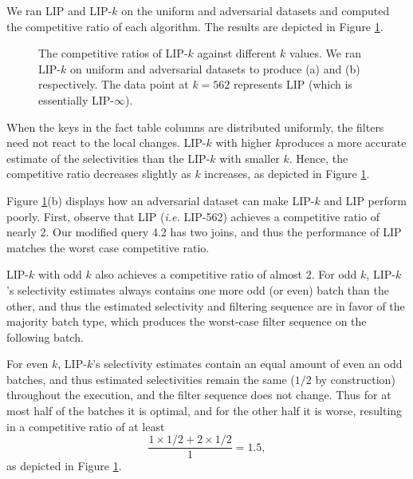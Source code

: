 We ran LIP and LIP-$k$ on the uniform and adversarial datasets and computed the competitive ratio of each algorithm.
The results are depicted in Figure \ref{fig:cr}. 

\begin{figure}
    \centering

    \quad
    
    \caption{The competitive ratios of LIP-$k$ against different $k$ values. We ran LIP-$k$ on uniform and adversarial datasets to produce (a) and (b) respectively. The data point at $k = 562$ represents LIP (which is essentially LIP-$\infty$).}
    \label{fig:cr}
\end{figure}

When the keys in the fact table columns are distributed uniformly, the filters need not react to the local changes. LIP-$k$ with higher $k$produces a more accurate estimate of the selectivities than the LIP-$k$ with smaller $k$. Hence, the competitive ratio decreases slightly as $k$ increases, as depicted in Figure \ref{fig:cr}.

Figure \ref{fig:cr}(b) displays how an adversarial dataset can make LIP-$k$ and LIP perform poorly. 
First, observe that LIP ({\it i.e.} LIP-562) achieves a competitive ratio of nearly 2.
Our modified query 4.2 has two joins, and thus the performance of LIP matches the worst case competitive ratio. 

LIP-$k$ with odd $k$ also achieves a competitive ratio of almost 2. 
For odd $k$, LIP-$k$'s selectivity estimates always contains one more odd (or even) batch than the other, 
and thus the estimated selectivity and filtering sequence are in favor of the majority batch type,
which produces the worst-case filter sequence on the following batch.

For even $k$, LIP-$k$'s selectivity estimates contain an equal amount of even an odd batches,  
and thus estimated selectivities remain the same ($1/2$ by construction) throughout the execution, 
and the filter sequence does not change. Thus for at most half of the batches it is optimal, 
and for the other half it is worse, 
resulting in a competitive ratio of at least \[ \frac{1 \times 1/2 + 2 \times 1/2}{1} = 1.5,\] as depicted in Figure \ref{fig:cr}. 

